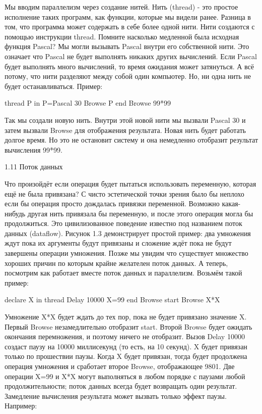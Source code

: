 Мы вводим параллелизм через создание нитей. Нить (thread) - это простое исполнение таких программ, как функции, которые мы видели ранее. Разница в том, что программа может содержать в себе более одной нити. Нити создаются с помощью инструкции thread. Помните насколько медленной была исходная функция Pascal? Мы могли вызывать Pascal внутри его собственной нити. Это означает что Pascal не будет выполнять никаких других вычислений. Если Pascal будет выполнять много вычислений, то время ожидания может затянуться. А всё потому, что нити разделяют между собой один компьютер. Но, ни одна нить не будет останавливаться. Пример:

thread P in
P={Pascal 30}
{Browse P}
end
{Browse 99*99}

Так мы создали новую нить. Внутри этой новой нити мы вызвали {Pascal 30} и затем вызвали Browse для отображения результата. Новая нить будет работать долгое время. Но это не остановит систему и она немедленно отобразит результат вычисления 99*99.

1.11 Поток данных

Что произойдёт если операция будет пытаться использовать переменную, которая ещё не была привязана? С чисто эстетической точки зрения было бы неплохо если бы операция просто дождалась привязки переменной. Возможно какая-нибудь другая нить привязала бы переменную, и после этого операция могла бы продолжиться. Это цивилизованное поведение известно под названием поток данных (dataflow). Рисунок 1.3 демонстрирует простой пример: два умножения ждут пока их аргументы будут привязаны и сложение ждёт пока не будут завершены операции умножения. Позже мы увидим что существует множество хороших причин по которым крайне желателен поток данных. А теперь, посмотрим как работает вместе поток данных и параллелизм. Возьмём такой пример:

declare X in
thread {Delay 10000} X=99 end
{Browse start} {Browse X*X}

Умножение X*X будет ждать до тех пор, пока не будет привязано значение X. Первый Browse незамедлительно отобразит start. Второй Browse будет ожидать окончания перемножения, и поэтому ничего не отобразит. Вызов {Delay 10000} создаст паузу на 10000 миллисекунд (то есть, на 10 секунд). X будет привязан только по прошествии паузы. Когда X будет привязан, тогда будет продолжена операция умножения и сработает второе Browse, отображающее 9801. Две операции X=99 и X*X могут выполняться в любом порядке с паузами любой продолжительности; поток данных всегда будет возвращать один результат. Замедление вычисления результата может вызвать только эффект паузы. Например:

